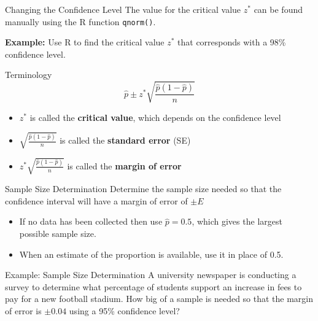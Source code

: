 \documentclass[11pt]{beamer}
\begin{document}
\begin{frame}{Changing the Confidence Level}
\vspace{-3cm}
The value for the critical value $z^*$ can be found manually using the R function \texttt{qnorm()}.\\
\vspace{15pt}

\textbf{Example:} Use R to find the critical value $z^*$ that corresponds with a 98\% confidence level.\\

\end{frame}



\begin{frame}{Terminology}
$$\hat{p} \pm z^* \sqrt{\frac{\hat{p}(1-\hat{p})}{n}}$$
\begin{itemize}
\item $z^*$ is called the \textbf{critical value}, which depends on the confidence level
\vspace{10pt}
\item $\sqrt{\frac{\hat{p}(1-\hat{p})}{n}}$ is called the \textbf{standard error} (SE)
\vspace{10pt}
\item $z^* \sqrt{\frac{\hat{p}(1-\hat{p})}{n}}$ is called the \textbf{margin of error} 
\end{itemize}
\end{frame}


\begin{frame}{Sample Size Determination}
Determine the sample size needed so that the confidence interval will have a margin of error of $\pm E$
\vspace{4cm}

\small
\begin{itemize}
\item If no data has been collected then use $\hat{p} = 0.5$, which gives the largest possible sample size.
\item When an estimate of the proportion is available, use it in place of 0.5.
\end{itemize}
\end{frame}

\begin{frame}{Example: Sample Size Determination}
\vspace{-3.5cm}
A university newspaper is conducting a survey to determine what percentage of students support an increase in fees to pay for a new football stadium.  How big of a sample is needed so that the margin of error is $\pm 0.04$ using a 95\% confidence level?\\
\end{frame}
\end{document}
